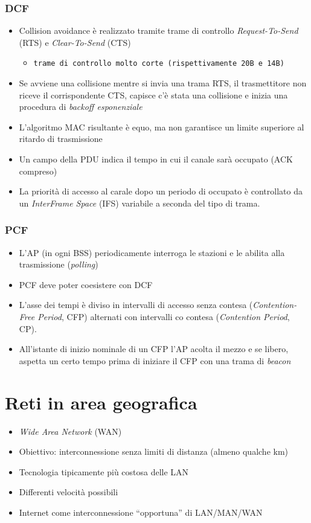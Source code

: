 \documentclass{book}
\begin{document}
\subsubsection{DCF}
\begin{itemize}
\item Collision avoidance è realizzato tramite trame di controllo \textit{Request-To-Send} (RTS) e \textit{Clear-To-Send} (CTS)
  \begin{itemize}
	\item {\tt trame di controllo molto corte (rispettivamente 20B e 14B)}
  \end{itemize}
\item Se avviene una collisione mentre si invia una trama RTS, il trasmettitore non riceve il corrispondente CTS, capisce c'è stata una collisione e inizia una procedura di {\em backoff esponenziale}
\item L'algoritmo MAC risultante è equo, ma non garantisce un limite superiore al ritardo di trasmissione
\item Un campo della PDU indica il tempo in cui il canale sarà occupato (ACK compreso)
  \item La priorità di accesso al carale dopo un periodo di occupato è controllato da un \textit{InterFrame Space} (IFS) variabile a seconda del tipo di trama.
\end{itemize}

\subsubsection{PCF}
\begin{itemize}
\item L'AP (in ogni BSS) periodicamente interroga le stazioni e le abilita alla trasmissione ({\it polling})
\item PCF deve poter coesistere con DCF
\item L'asse dei tempi è diviso in intervalli di accesso senza contesa ({\it Contention-Free Period}, CFP) alternati con intervalli co contesa ({\it Contention Period}, CP).
\item All'istante di inizio nominale di un CFP l'AP acolta il mezzo e se libero, aspetta un certo tempo prima di iniziare il CFP con una trama di {\it beacon}
\end{itemize}
\section{Reti in area geografica}
\begin{itemize}
\item {\it Wide Area Network} (WAN)
\item Obiettivo: interconnessione senza limiti di distanza (almeno qualche km)
\item Tecnologia tipicamente più costosa delle LAN
\item Differenti velocità possibili
\item Internet come interconnessione ``opportuna'' di LAN/MAN/WAN
\end{itemize}
\end{document}
